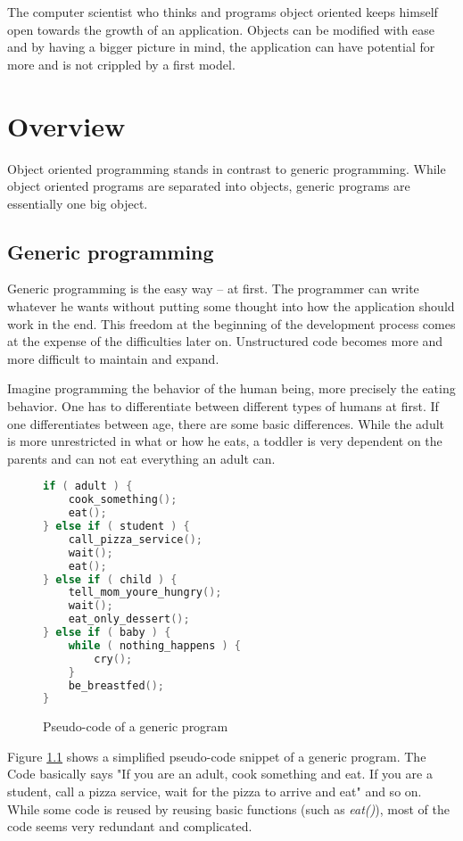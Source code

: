 The computer scientist who thinks and programs object oriented keeps himself open towards the growth of an application. Objects can be modified with ease and by having a bigger picture in mind, the application can have potential for more and is not crippled by a first model.

\chapter{Overview}
Object oriented programming stands in contrast to generic programming. While object oriented programs are separated into objects, generic programs are essentially one big object.
\section{Generic programming}
Generic programming is the easy way -- at first. The programmer can write whatever he wants without putting some thought into how the application should work in the end. This freedom at the beginning of the development process comes at the expense of the difficulties later on. Unstructured code becomes more and more difficult to maintain and expand.

Imagine programming the behavior of the human being, more precisely the eating behavior. One has to differentiate between different types of humans at first. If one differentiates between age, there are some basic differences. While the adult is more unrestricted in what or how he eats, a toddler is very dependent on the parents and can not eat everything an adult can.
\begin{figure}[!h]
\begin{lstlisting}[language=C]
if ( adult ) {
	cook_something();
	eat();
} else if ( student ) {
	call_pizza_service();
	wait();
	eat();
} else if ( child ) {
	tell_mom_youre_hungry();
	wait();
	eat_only_dessert();
} else if ( baby ) {
	while ( nothing_happens ) {
		cry();
	}
	be_breastfed();
}
\end{lstlisting}
\caption{Pseudo-code of a generic program}
\label{fig:generic_code}
\end{figure}

Figure \ref{fig:generic_code} shows a simplified pseudo-code snippet of a generic program. The Code basically says "If you are an adult, cook something and eat. If you are a student, call a pizza service, wait for the pizza to arrive and eat" and so on. While some code is reused by reusing basic functions (such as \emph{eat()}), most of the code seems very redundant and complicated.

